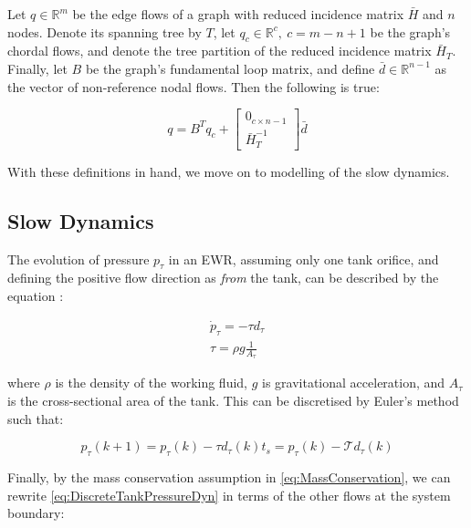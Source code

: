\newpage

\begin{lem}\label{lem:EdgeFlowDecomposition}
	Let $q \in \mathbb{R}^m$ be the edge flows of a graph with reduced incidence matrix $\bar{H}$ and $n$ nodes. Denote its spanning tree by $T$, let $q_c \in \mathbb{R}^c, \ c = m-n+1$ be the graph's chordal flows, and denote the tree partition of the reduced incidence matrix $\bar{H}_T$. Finally, let $B$ be the graph's fundamental loop matrix, and define $\bar{d} \in \mathbb{R}^{n-1}$ as the vector of non-reference nodal flows. Then the following is true:
	
	\begin{equation}\label{eq:EdgeFlowDecomposition}
		q = B^T q_c +
		\begin{bmatrix}
			0_{c \times n-1} \\ \bar{H}_T^{-1} 
		\end{bmatrix}
		\bar{d}
	\end{equation}
\end{lem}

With these definitions in hand, we move on to modelling of the slow dynamics.

\subsection{Slow Dynamics}\label{subsec:SlowDynamics}

The evolution of pressure $p_\tau$ in an EWR, assuming only one tank orifice, and defining the positive flow direction as \textit{from} the tank, can be described by the equation \cite{Jensen,Suresh2009}:

\begin{gather}\label{eq:TankPressureDyn}
	\dot{p}_\tau = -\tau d_\tau
	\\ \tau = \rho g \frac{1}{A_\tau}
\end{gather}

where $\rho$ is the density of the working fluid, $g$ is gravitational acceleration, and $A_\tau$ is the cross-sectional area of the tank. This can be discretised by Euler's method such that:

\begin{equation}\label{eq:DiscreteTankPressureDyn}
	p_\tau(k+1) = p_\tau(k) - \tau d_\tau(k)t_s =  p_\tau(k) - \mathcal{T} d_\tau(k)
\end{equation}

Finally, by the mass conservation assumption in \cref{eq:MassConservation}, we can rewrite \cref{eq:DiscreteTankPressureDyn} in terms of the other flows at the system boundary:

